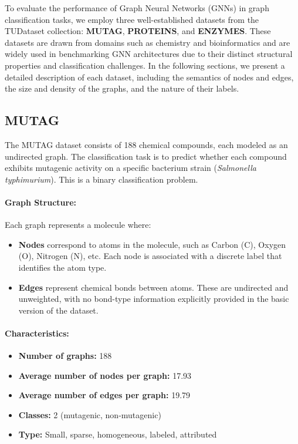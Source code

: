 \documentclass[11pt,a4paper]{article}
\begin{document}
	
	
To evaluate the performance of Graph Neural Networks (GNNs) in graph classification tasks, we employ three well-established datasets from the TUDataset collection: \textbf{MUTAG}, \textbf{PROTEINS}, and \textbf{ENZYMES}. These datasets are drawn from domains such as chemistry and bioinformatics and are widely used in benchmarking GNN architectures due to their distinct structural properties and classification challenges. In the following sections, we present a detailed description of each dataset, including the semantics of nodes and edges, the size and density of the graphs, and the nature of their labels.

\subsection*{MUTAG}

The MUTAG dataset consists of 188 chemical compounds, each modeled as an undirected graph. The classification task is to predict whether each compound exhibits mutagenic activity on a specific bacterium strain (\textit{Salmonella typhimurium}). This is a binary classification problem.

\paragraph{Graph Structure:}
Each graph represents a molecule where:
\begin{itemize}
	\item \textbf{Nodes} correspond to atoms in the molecule, such as Carbon (C), Oxygen (O), Nitrogen (N), etc. Each node is associated with a discrete label that identifies the atom type.
	\item \textbf{Edges} represent chemical bonds between atoms. These are undirected and unweighted, with no bond-type information explicitly provided in the basic version of the dataset.
\end{itemize}

\paragraph{Characteristics:}
\begin{itemize}
	\item \textbf{Number of graphs:} 188
	\item \textbf{Average number of nodes per graph:} 17.93
	\item \textbf{Average number of edges per graph:} 19.79
	\item \textbf{Classes:} 2 (mutagenic, non-mutagenic)
	\item \textbf{Type:} Small, sparse, homogeneous, labeled, attributed
\end{itemize}
\end{document}
